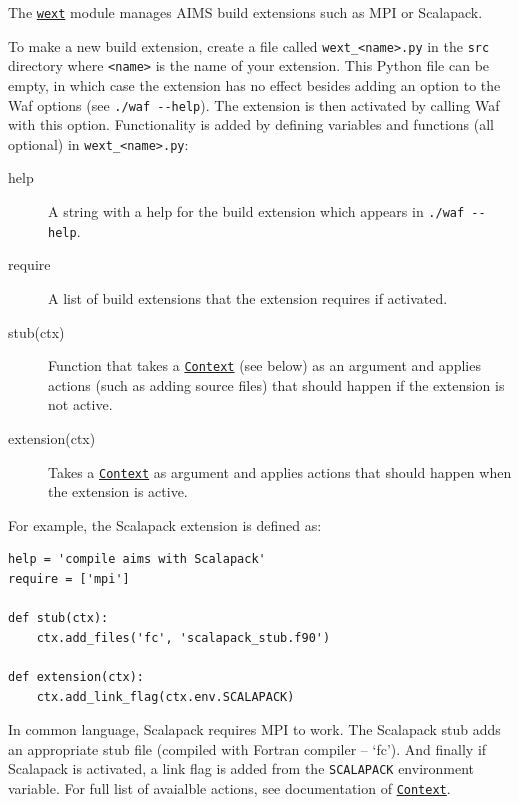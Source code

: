 
The \hyperref[module-wext]{\texttt{wext}} module manages AIMS build
extensions such as MPI or Scalapack.

To make a new build extension, create a file called
\texttt{wext\_\textless{}name\textgreater{}.py} in the \texttt{src}
directory where \texttt{\textless{}name\textgreater{}} is the name of
your extension. This Python file can be empty, in which case the
extension has no effect besides adding an option to the Waf options (see
\texttt{./waf\ -\/-help}). The extension is then activated by calling
Waf with this option. Functionality is added by defining variables and
functions (all optional) in
\texttt{wext\_\textless{}name\textgreater{}.py}:

\begin{description}
\item[help]
A string with a help for the build extension which appears in
\texttt{./waf\ -\/-help}.
\item[require]
A list of build extensions that the extension requires if activated.
\item[stub(ctx)]
Function that takes a \hyperref[wext.Context]{\texttt{Context}} (see
below) as an argument and applies actions (such as adding source files)
that should happen if the extension is not active.
\item[extension(ctx)]
Takes a \hyperref[wext.Context]{\texttt{Context}} as argument and
applies actions that should happen when the extension is active.
\end{description}

For example, the Scalapack extension is defined as:

\begin{verbatim}
help = 'compile aims with Scalapack'
require = ['mpi']

def stub(ctx):
    ctx.add_files('fc', 'scalapack_stub.f90')

def extension(ctx):
    ctx.add_link_flag(ctx.env.SCALAPACK)
\end{verbatim}

In common language, Scalapack requires MPI to work. The Scalapack stub
adds an appropriate stub file (compiled with Fortran compiler -- `fc').
And finally if Scalapack is activated, a link flag is added from the
\texttt{SCALAPACK} environment variable. For full list of avaialble
actions, see documentation of \hyperref[wext.Context]{\texttt{Context}}.

